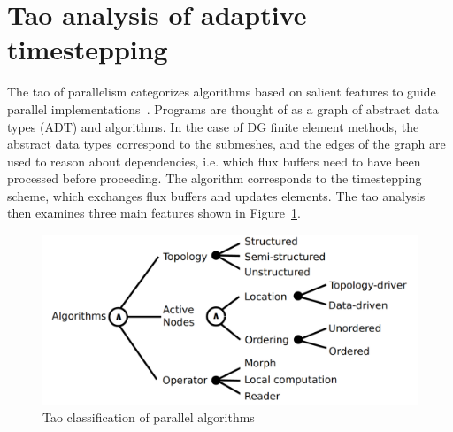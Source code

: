 \section{Tao analysis of adaptive timestepping}
The tao of parallelism categorizes algorithms based on salient features to guide parallel implementations~\cite{Pingali2011}. Programs are thought of as a graph of abstract data types (ADT) and algorithms. In the case of DG finite element methods, the abstract data types correspond to the submeshes, and the edges of the graph are used to reason about dependencies, i.e. which flux buffers need to have been processed before proceeding. The algorithm corresponds to the timestepping scheme, which exchanges flux buffers and updates elements.
The tao analysis then examines three main features shown in Figure~\ref{fig:tao-analysis}.

\begin{figure}
\centering
\includegraphics[height=0.25 \textheight]{work_estimate_storm36/tao.png}
\caption{Tao classification of parallel algorithms\cite{Pingali2011}}
\label{fig:tao-analysis}
\end{figure}

